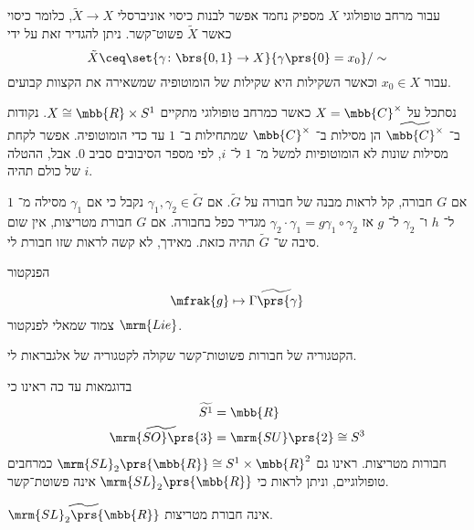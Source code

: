 \documentclass[10pt, twoside]{book}
\newcommand{\Lie}{\mrm{Lie}}
\begin{document}
\begin{remark}
עבור מרחב טופולוגי
$X$
מספיק נחמד אפשר לבנות כיסוי אוניברסלי
$\tilde{X} \to X$,
כלומר כיסוי כאשר
$\tilde{X}$
פשוט־קשר.
ניתן להגדיר זאת על ידי
\[\tilde{X} \ceq \set{\gamma \colon \brs{0,1} \to X}{\gamma\prs{0} = x_0} / \sim\]
עבור
$x_0 \in X$
וכאשר השקילות היא שקילות של הומוטופיה שמשאירה את הקצוות קבועים.
\end{remark}

\begin{example}
נסתכל על
$X = \mbb{C}^\times$
כאשר כמרחב טופולוגי מתקיים
$X \cong \mbb{R} \times S^1$.
נקודות ב־%
$\widetilde{\mbb{C}^\times}$
הן מסילות ב־%
$\mbb{C}^\times$
שמתחילות ב־%
$1$
עד כדי הומוטופיה.
אפשר לקחת מסילות שונות לא הומוטופיות למשל מ־%
$1$
ל־%
$i$,
לפי מספר הסיבובים סביב
$0$.
אבל, ההטלה של כולם תהיה
$i$.
\end{example}

\begin{remark}
אם
$G$
חבורה, קל לראות מבנה של חבורה על
$\tilde{G}$.
אם
$\gamma_1, \gamma_2 \in \tilde{G}$
נקבל כי אם
$\gamma_1$
מסילה מ־%
$1$
ל־%
$h$
ו־%
$\gamma_2$
ל־%
$g$
אז
$\gamma_2 \cdot \gamma_1 = g \gamma_1 \circ \gamma_2$
מגדיר כפל בחבורה.
אם
$G$
חבורת מטריצות, אין שום סיבה ש־%
$\tilde{G}$
תהיה כזאת. מאידך, לא קשה לראות שזו חבורת לי.
\end{remark}



\begin{remark}
הפנקטור
\[\mfrak{g} \mapsto \widetilde{\Gamma\prs{\gamma}}\]
צמוד שמאלי לפנקטור
$\Lie$.
\end{remark}

\begin{remark}
הקטגוריה של חבורות פשוטות־קשר שקולה לקטגוריה של אלגבראות לי.
\end{remark}


\begin{example}
בדוגמאות עד כה ראינו כי
\begin{align*}
\widetilde{S^1} &= \mbb{R} \\
\widetilde{\mrm{SO}\prs{3}} &= \mrm{SU}\prs{2} \cong S^3
\end{align*}
חבורות מטריצות. ראינו גם
$\mrm{SL}_2\prs{\mbb{R}} \cong S^1 \times \mbb{R}^2$
כמרחבים טופולוגיים, וניתן לראות כי
$\mrm{SL}_2\prs{\mbb{R}}$
אינה פשוטת־קשר.
\end{example}

\begin{proposition}
$\widetilde{\mrm{SL}_2\prs{\mbb{R}}}$
אינה חבורת מטריצות.
\end{proposition}
\end{document}
